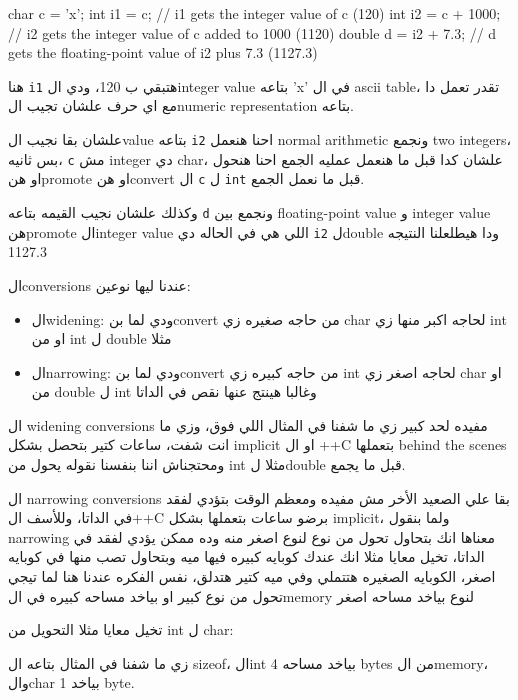 \documentclass[11pt]{article}
\let\OriginalVerbatim\verbatim
\let\endOriginalVerbatim\endverbatim
\renewenvironment{verbatim}{\begin{english}\OriginalVerbatim}{\endOriginalVerbatim\end{english}}
\begin{document}
\begin{verbatim}
char c = 'x';
int i1 = c;           // i1 gets the integer value of c (120)
int i2 = c + 1000;    // i2 gets the integer value of c added to 1000 (1120)
double d = i2 + 7.3;  // d gets the floating-point value of i2 plus 7.3 (1127.3)
\end{verbatim}

هنا \texttt{i1} هتبقي ب 120، ودي الinteger value بتاعه 'x' في ال ascii table، تقدر تعمل دا مع اي حرف علشان تجيب الnumeric representation بتاعه.

علشان بقا نجيب الvalue بتاعه \texttt{i2} احنا هنعمل normal arithmetic ونجمع two integers، بس ثانيه، \texttt{c} مش integer دي char، علشان كدا قبل ما هنعمل عمليه الجمع احنا هنحول او هنpromote او هنconvert ال \texttt{c} ل \texttt{int} قبل ما نعمل الجمع.

وكذلك علشان نجيب القيمه بتاعه \texttt{d} ونجمع بين floating-point value و integer value هنpromote الinteger value اللي هي في الحاله دي \texttt{i2} لdouble ودا هيطلعلنا النتيجه 1127.3

الconversions عندنا ليها نوعين:
\begin{itemize}
\item الwidening: ودي لما بنconvert من حاجه صغيره زي char لحاجه اكبر منها زي int او من int ل double مثلا
\item الnarrowing: ودي لما بنconvert من حاجه كبيره زي int لحاجه اصغر زي char او من double ل int وغالبا هينتج عنها نقص في الداتا
\end{itemize}


ال widening conversions مفيده لحد كبير زي ما شفنا في المثال اللي فوق، وزي ما انت شفت، ساعات كتير بتحصل بشكل implicit او ال ++C بتعملها behind the scenes ومحتجناش اننا بنفسنا نقوله يحول من int مثلا لdouble قبل ما يجمع.

ال narrowing conversions بقا علي الصعيد الأخر مش مفيده ومعظم الوقت بتؤدي لفقد في الداتا، وللأسف ال++C برضو ساعات بتعملها بشكل implicit، ولما بنقول narrowing معناها انك بتحاول تحول من نوع لنوع اصغر منه وده ممكن يؤدي لفقد في الداتا، تخيل معايا مثلا انك عندك كوبايه كبيره فيها ميه وبتحاول تصب منها في كوبايه اصغر، الكوبايه الصغيره هتتملي وفي ميه كتير هتدلق، نفس الفكره عندنا هنا لما تيجي تحول من نوع كبير او بياخد مساحه كبيره في الmemory لنوع بياخد مساحه اصغر

تخيل معايا مثلا التحويل من int ل char:

زي ما شفنا في المثال بتاعه ال sizeof، الint بياخد مساحه 4 bytes من الmemory، والchar بياخد 1 byte.
\end{document}
